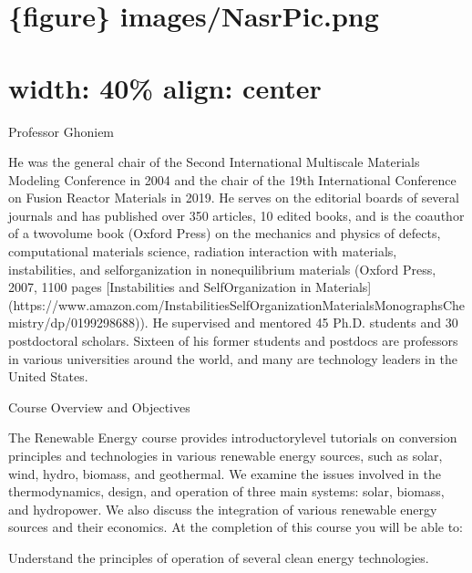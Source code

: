 \documentclass[letterpaper,10pt,english]{jupyterBook}
\begin{document}
\section{\{figure\} images/Nasr\sphinxhyphen{}Pic.png}
\label{\detokenize{10WeekSyllabus:figure-images-nasr-pic-png}}

\section{width: 40\%
align: center}
\label{\detokenize{10WeekSyllabus:width-40-align-center}}
\sphinxAtStartPar
Professor Ghoniem

\begin{sphinxVerbatim}[commandchars=\\\{\}]

He was the general chair of the Second International Multiscale
Materials Modeling Conference in 2004 and the chair of the 19\PYGZdl{}\PYGZca{}\PYGZob{}th\PYGZcb{}\PYGZdl{}
International Conference on Fusion Reactor Materials in 2019. He serves
on the editorial boards of several journals and has published over 350
articles, 10 edited books, and is the co\PYGZhy{}author of a two\PYGZhy{}volume book
(Oxford Press) on the mechanics and physics of defects, computational
materials science, radiation interaction with materials, instabilities,
and self\PYGZhy{}organization in non\PYGZhy{}equilibrium materials (Oxford Press, 2007,
1100 pages \PYGZhy{} [Instabilities and Self\PYGZhy{}Organization in Materials](https://www.amazon.com/Instabilities\PYGZhy{}Self\PYGZhy{}Organization\PYGZhy{}Materials\PYGZhy{}Monographs\PYGZhy{}Chemistry/dp/0199298688)). He supervised and mentored 45 Ph.D. students and 30
postdoctoral scholars. Sixteen of his former students and postdocs are professors in various universities around the world, and many are technology leaders in the United States.

\PYGZsh{} Course Overview and Objectives

The Renewable Energy course provides introductory\PYGZhy{}level tutorials on
conversion principles and technologies in various renewable energy sources,
such as solar, wind, hydro, biomass, and geothermal. We examine the
issues involved in the thermodynamics, design, and operation of three
main systems: solar, biomass, and hydropower. We also discuss the integration of various renewable energy
sources and their economics. At the completion of this course you will
be able to:

\PYGZhy{}   Understand the principles of operation of several clean energy
    technologies.


\end{sphinxVerbatim}
\end{document}
